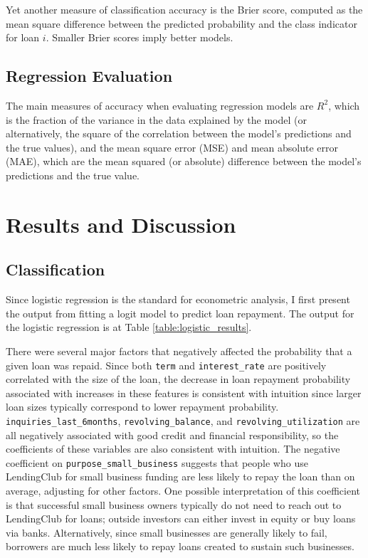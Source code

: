 \documentclass[12pt]{article}
\begin{document}
Yet another measure of classification accuracy is the Brier score, computed as the mean square difference between the predicted probability and the class indicator for loan $i$. Smaller Brier scores imply better models.


\subsection{Regression Evaluation}

The main measures of accuracy when evaluating regression models are $R^2$, which is the fraction of the variance in the data explained by the model (or alternatively, the square of the correlation between the model's predictions and the true values), and the mean square error (MSE) and mean absolute error (MAE), which are the mean squared (or absolute) difference between the model's predictions and the true value. 

\section{Results and Discussion}

\subsection{Classification}
\label{subsection:classification_results}

Since logistic regression is the standard for econometric analysis, I first present the output from fitting a logit model to predict loan repayment. The output for the logistic regression is at Table \ref{table:logistic_results}. 

There were several major factors that negatively affected the probability that a given loan was repaid. Since both \texttt{term} and \texttt{interest\_rate} are positively correlated with the size of the loan, the decrease in loan repayment probability associated with increases in these features is consistent with intuition since larger loan sizes typically correspond to lower repayment probability. \texttt{inquiries\_last\_6months}, \texttt{revolving\_balance}, and \texttt{revolving\_utilization} are all negatively associated with good credit and financial responsibility, so the coefficients of these variables are also consistent with intuition. The negative coefficient on \texttt{purpose\_small\_business} suggests that people who use LendingClub for small business funding are less likely to repay the loan than on average, adjusting for other factors. One possible interpretation of this coefficient is that successful small business owners typically do not need to reach out to LendingClub for loans; outside investors can either invest in equity or buy loans via banks. Alternatively, since small businesses are generally likely to fail, borrowers are much less likely to repay loans created to sustain such businesses.
\end{document}
